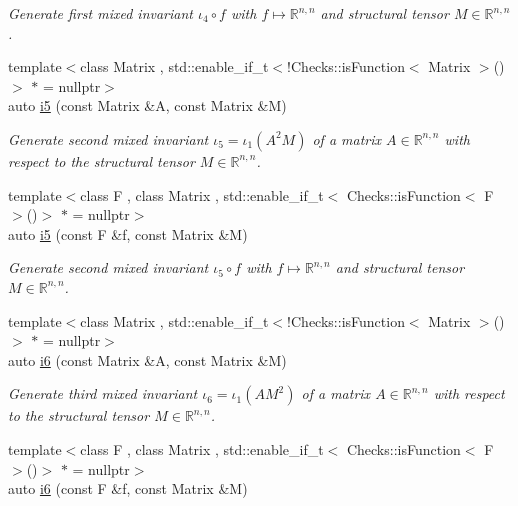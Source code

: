 \begin{DoxyCompactItemize}
\begin{DoxyCompactList}\small\item\em Generate first mixed invariant $ \iota_4\circ f $ with $f\mapsto\mathbb{R}^{n,n}$ and structural tensor $M\in\mathbb{R}^{n,n}$. \end{DoxyCompactList}\item 
{\footnotesize template$<$class Matrix , std\+::enable\+\_\+if\+\_\+t$<$!\+Checks\+::is\+Function$<$ Matrix $>$()$>$ $\ast$  = nullptr$>$ }\\auto \hyperlink{group__InvariantGroup_gabedc42182203d883278e29fd16b355a0}{i5} (const Matrix \&A, const Matrix \&M)
\begin{DoxyCompactList}\small\item\em Generate second mixed invariant $ \iota_5=\iota_1(A^2M) $ of a matrix $A\in\mathbb{R}^{n,n}$ with respect to the structural tensor $M\in\mathbb{R}^{n,n}$. \end{DoxyCompactList}\item 
{\footnotesize template$<$class F , class Matrix , std\+::enable\+\_\+if\+\_\+t$<$ Checks\+::is\+Function$<$ F $>$()$>$ $\ast$  = nullptr$>$ }\\auto \hyperlink{group__InvariantGroup_gaed7e47c39d89f2b01e25c992da78b44d}{i5} (const F \&f, const Matrix \&M)
\begin{DoxyCompactList}\small\item\em Generate second mixed invariant $ \iota_5\circ f $ with $f\mapsto\mathbb{R}^{n,n}$ and structural tensor $M\in\mathbb{R}^{n,n}$. \end{DoxyCompactList}\item 
{\footnotesize template$<$class Matrix , std\+::enable\+\_\+if\+\_\+t$<$!\+Checks\+::is\+Function$<$ Matrix $>$()$>$ $\ast$  = nullptr$>$ }\\auto \hyperlink{group__InvariantGroup_gad9f0627946667bb052212f65ecdd002b}{i6} (const Matrix \&A, const Matrix \&M)
\begin{DoxyCompactList}\small\item\em Generate third mixed invariant $ \iota_6=\iota_1(AM^2) $ of a matrix $A\in\mathbb{R}^{n,n}$ with respect to the structural tensor $M\in\mathbb{R}^{n,n}$. \end{DoxyCompactList}\item 
{\footnotesize template$<$class F , class Matrix , std\+::enable\+\_\+if\+\_\+t$<$ Checks\+::is\+Function$<$ F $>$()$>$ $\ast$  = nullptr$>$ }\\auto \hyperlink{group__InvariantGroup_ga2536c80df733bb3e089487202c3688c1}{i6} (const F \&f, const Matrix \&M)

\end{DoxyCompactItemize}
